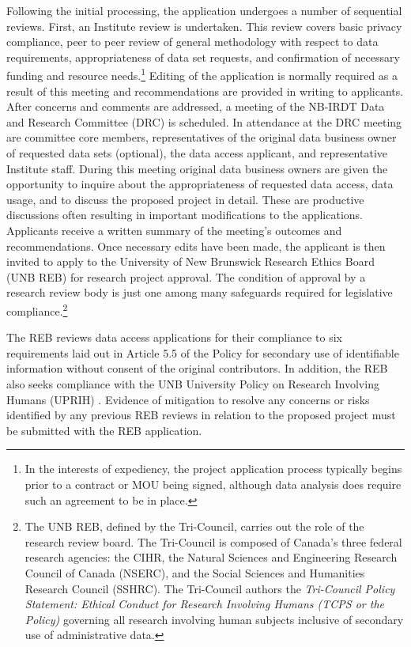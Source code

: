 Following the initial processing, the application undergoes a number of sequential reviews. First, an Institute review is undertaken. This review covers basic privacy compliance, peer to peer review of general methodology with respect to data requirements, appropriateness of data set requests, and confirmation of necessary funding and resource needs.\footnote{In the interests of expediency, the project application process typically begins prior to a contract or MOU being signed, although data analysis does require such an agreement to be in place.} Editing of the application is normally required as a result of this meeting and recommendations are provided in writing to applicants. After concerns and comments are addressed, a meeting of the NB-IRDT Data and Research Committee (DRC) is scheduled. In attendance at the DRC meeting are committee core members, representatives of the original data business owner of requested data sets (optional), the data access applicant, and representative Institute staff. During this meeting original data business owners are given the opportunity to inquire about the appropriateness of requested data access, data usage, and to discuss the proposed project in detail. These are productive discussions often resulting in important modifications to the applications. Applicants receive a written summary of the meeting's outcomes and recommendations. Once necessary edits have been made, the applicant is then invited to apply to the University of New Brunswick Research Ethics Board (UNB REB) for research project approval. The condition of approval by a research review body is just one among many safeguards required for legislative compliance.\footnote{The UNB REB, defined by the Tri-Council, carries out the role of the research review board. The Tri-Council is composed of Canada's three federal research agencies: the CIHR, the Natural Sciences and Engineering Research Council of Canada (NSERC), and the Social Sciences and Humanities Research Council (SSHRC). The Tri-Council authors the \emph{Tri-Council Policy Statement: Ethical Conduct for Research Involving Humans (TCPS or the Policy)} \citep{governmentofcanadainteragencyadvisorypanelonresearchethics2020} governing all research involving human subjects inclusive of secondary use of administrative data.}

The REB reviews data access applications for their compliance to six requirements laid out in Article 5.5 of the Policy for secondary use of identifiable information without consent of the original contributors. In addition, the REB also seeks compliance with the UNB University Policy on Research Involving Humans (UPRIH) \citep{officeofresearchservicesuniversityofnewbrunswick2011}. Evidence of mitigation to resolve any concerns or risks identified by any previous REB reviews in relation to the proposed project must be submitted with the REB application.

